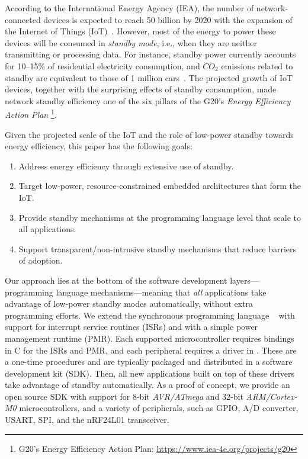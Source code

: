 \label{sec.introduction}

According to the International Energy Agency (IEA), the number of
network-connected devices is expected to reach 50 billion by 2020 with the
expansion of the Internet of Things (IoT)~\cite{iea.data}.
%
However, most of the energy to power these devices will be consumed in
\emph{standby mode}, i.e., when they are neither transmitting or processing
data.
%
For instance, standby power currently accounts for 10--15\% of residential
electricity consumption, and $CO_2$ emissions related to standby are equivalent
to those of 1 million cars~\cite{iea.data,standby.australia}.
%
The projected growth of IoT devices, together with the surprising effects of
standby consumption, made network standby efficiency one of the six
pillars of the G20's \emph{Energy Efficiency Action Plan}%
\footnote{G20's Energy Efficiency Action Plan: \url{https://www.iea-4e.org/projects/g20}}.

Given the projected scale of the IoT and the role of low-power standby towards
energy efficiency, this paper has the following goals:

\begin{enumerate}
\item Address energy efficiency through extensive use of standby.
\item Target low-power, resource-constrained embedded architectures that form
      the IoT.
\item Provide standby mechanisms at the programming language level that scale
      to all applications.
\item Support transparent/non-intrusive standby mechanisms that reduce barriers
      of adoption.
\end{enumerate}

Our approach lies at the bottom of the software development
layers---programming language mechanisms---meaning that \emph{all} applications
take advantage of low-power standby modes automatically, without extra
programming efforts.
%
We extend the synchronous programming language
\CEU~\cite{ceu.sensys13,ceu.tecs17} with support for interrupt service routines
(ISRs) and with a simple power management runtime (PMR).
%
Each supported microcontroller requires bindings in C for the ISRs and PMR, and
each peripheral requires a driver in \CEU.
These are a one-time procedures and are typically packaged and distributed in a
software development kit (SDK).
%
Then, all new applications built on top of these drivers take advantage of
standby automatically.
%
As a proof of concept, we provide an open source SDK %
with support for 8-bit
\emph{AVR/ATmega} and 32-bit \emph{ARM/Cortex-M0} microcontrollers, and a
variety of peripherals, such as GPIO, A/D converter, USART, SPI, and the nRF24L01
transceiver.


